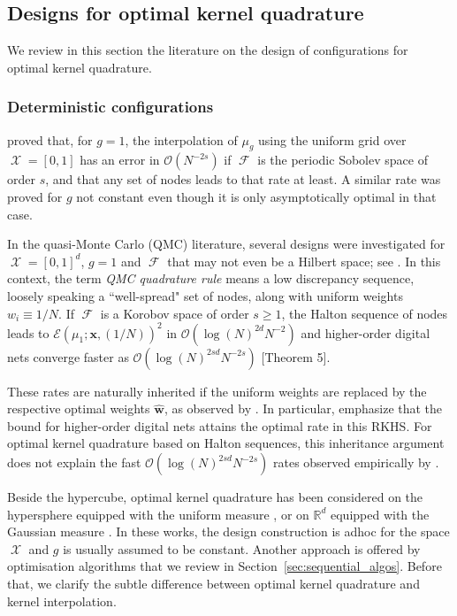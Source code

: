 \documentclass[twoside,11pt]{book}
\numberwithin{theorem}{chapter}
\numberwithin{definition}{chapter}
\numberwithin{proposition}{chapter}
\numberwithin{corollary}{chapter}
\numberwithin{example}{chapter}
\numberwithin{lemma}{chapter}
\numberwithin{assumption}{chapter}
\DeclareMathOperator{\F}{\mathcal{F}}
\DeclareMathOperator{\X}{\mathcal{X}}
\newcommand{\rb}[1]{\textcolor{magenta}{#1}}
\begin{document}
\subsection{Designs for optimal kernel quadrature}
We review in this section the literature on the design of configurations for optimal kernel quadrature.
\subsubsection{Deterministic configurations}
\cite{Boj81} proved that, for $g=1$, the interpolation of $\mu_{g}$ using the uniform grid over $\X = [0,1]$ has an error in $\mathcal{O}(N^{-2s})$ if $\F$ is the periodic Sobolev space of order $s$, and that any set of nodes leads to that rate at least. A similar rate was proved for $g$ not constant \citep{NoUlWo15} even though it is only asymptotically optimal in that case.

In the quasi-Monte Carlo (QMC) literature, several designs were investigated for $\X = [0,1]^{d}$, $g = 1$ and $\F$ that may not even be a Hilbert space; see \citep{DiPi10}. In this context, the term \emph{QMC quadrature rule} means a low discrepancy sequence, loosely speaking a ``well-spread" set of nodes, along with uniform weights $w_{i} \equiv 1/N$. If $\F$ is a Korobov space of order $s \geq 1$, the Halton sequence of nodes \citep{Hal64} leads to $\mathcal{E}(\mu_1; \bm{x}, (1/N))^2$ in $\mathcal{O}(\log(N)^{2d} N^{-2})$ and higher-order digital nets converge faster as $\mathcal{O}(\log(N)^{2sd} N^{-2s})$ \citep{DiPi14}[Theorem 5].

These rates are naturally inherited if the uniform weights are replaced by the respective optimal weights $\hat{\bm{w}}$, as observed by \cite{BOGOS2019}. In particular, \cite{BOGOS2019} emphasize that the bound for higher-order digital nets attains the optimal rate in this RKHS.
For optimal kernel quadrature based on Halton sequences, this inheritance argument does not explain the fast $\mathcal{O}(\log(N)^{2sd} N^{-2s})$ rates observed empirically by \cite{Oett17}.

Beside the hypercube, optimal kernel quadrature has been considered on the hypersphere equipped with the uniform measure \citep{EhGrCh19}, or on $\mathbb{R}^{d}$ equipped with the Gaussian measure \citep{KaSa19}. In these works, the design construction is adhoc for the space $\X$ and
$g$ is usually assumed to be constant. Another approach is offered by optimisation algorithms that we review in Section~\ref{sec:sequential_algos}. Before that, we clarify the subtle difference between optimal kernel quadrature and kernel interpolation.
\end{document}
